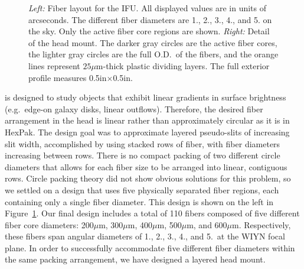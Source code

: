 \begin{figure}[t]
    \vspace{1.5mm}
    \caption[\GP Layout]{\fixspacing \emph{Left:} Fiber layout for the \GP
      IFU.  All displayed values are in units of arcseconds.  The different
      fiber diameters are 1., 2., 3., 4., and
      5. on the sky.  Only the active fiber core regions are shown.
      \emph{Right:} Detail of the \GP head mount.  The darker gray circles
      are the active fiber cores, the lighter gray circles are the full
      O.D.\ of the fibers, and the orange lines represent $25\mu$m-thick
      plastic dividing layers.  The full exterior profile measures
      0.5in$\times$0.5in.
    \label{fig:gradpak}}
\end{figure}


\GP is designed to study objects that exhibit linear gradients in surface
brightness (e.g.\ edge-on galaxy disks, linear outflows).  Therefore, the
desired fiber arrangement in the head is linear rather than approximately
circular as it is in HexPak.  The design goal was to approximate layered
pseudo-slits of increasing slit width, accomplished by using stacked rows of
fiber, with fiber diameters increasing between rows.  There is no compact
packing of two different circle diameters that allows for each fiber size to
be arranged into linear, contiguous rows.  Circle packing theory did not show
obvious solutions for this problem, so we settled on a design that uses five
physically separated fiber regions, each containing only a single fiber
diameter.  This design is shown on the left in Figure~\ref{fig:gradpak}.  Our
final design includes a total of 110 fibers composed of five different fiber
core diameters: 200$\mu$m, 300$\mu$m, 400$\mu$m, 500$\mu$m, and 600$\mu$m.
Respectively, these fibers span angular diameters of 1., 2.,
3., 4., and 5.\ at the WIYN focal plane.  In order to
successfully accommodate five different fiber diameters within the same
packing arrangement, we have designed a layered head mount.


